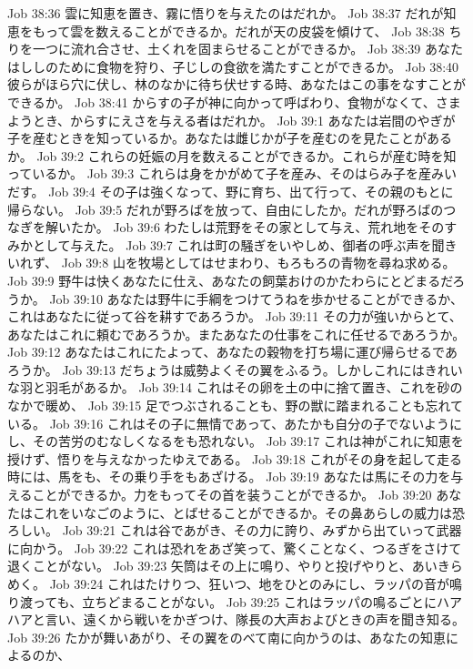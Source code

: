 Job 38:36  雲に知恵を置き、霧に悟りを与えたのはだれか。
Job 38:37  だれが知恵をもって雲を数えることができるか。だれが天の皮袋を傾けて、
Job 38:38  ちりを一つに流れ合させ、土くれを固まらせることができるか。
Job 38:39  あなたはししのために食物を狩り、子じしの食欲を満たすことができるか。
Job 38:40  彼らがほら穴に伏し、林のなかに待ち伏せする時、あなたはこの事をなすことができるか。
Job 38:41  からすの子が神に向かって呼ばわり、食物がなくて、さまようとき、からすにえさを与える者はだれか。
Job 39:1  あなたは岩間のやぎが子を産むときを知っているか。あなたは雌じかが子を産むのを見たことがあるか。
Job 39:2  これらの妊娠の月を数えることができるか。これらが産む時を知っているか。
Job 39:3  これらは身をかがめて子を産み、そのはらみ子を産みいだす。
Job 39:4  その子は強くなって、野に育ち、出て行って、その親のもとに帰らない。
Job 39:5  だれが野ろばを放って、自由にしたか。だれが野ろばのつなぎを解いたか。
Job 39:6  わたしは荒野をその家として与え、荒れ地をそのすみかとして与えた。
Job 39:7  これは町の騒ぎをいやしめ、御者の呼ぶ声を聞きいれず、
Job 39:8  山を牧場としてはせまわり、もろもろの青物を尋ね求める。
Job 39:9  野牛は快くあなたに仕え、あなたの飼葉おけのかたわらにとどまるだろうか。
Job 39:10  あなたは野牛に手綱をつけてうねを歩かせることができるか、これはあなたに従って谷を耕すであろうか。
Job 39:11  その力が強いからとて、あなたはこれに頼むであろうか。またあなたの仕事をこれに任せるであろうか。
Job 39:12  あなたはこれにたよって、あなたの穀物を打ち場に運び帰らせるであろうか。
Job 39:13  だちょうは威勢よくその翼をふるう。しかしこれにはきれいな羽と羽毛があるか。
Job 39:14  これはその卵を土の中に捨て置き、これを砂のなかで暖め、
Job 39:15  足でつぶされることも、野の獣に踏まれることも忘れている。
Job 39:16  これはその子に無情であって、あたかも自分の子でないようにし、その苦労のむなしくなるをも恐れない。
Job 39:17  これは神がこれに知恵を授けず、悟りを与えなかったゆえである。
Job 39:18  これがその身を起して走る時には、馬をも、その乗り手をもあざける。
Job 39:19  あなたは馬にその力を与えることができるか。力をもってその首を装うことができるか。
Job 39:20  あなたはこれをいなごのように、とばせることができるか。その鼻あらしの威力は恐ろしい。
Job 39:21  これは谷であがき、その力に誇り、みずから出ていって武器に向かう。
Job 39:22  これは恐れをあざ笑って、驚くことなく、つるぎをさけて退くことがない。
Job 39:23  矢筒はその上に鳴り、やりと投げやりと、あいきらめく。
Job 39:24  これはたけりつ、狂いつ、地をひとのみにし、ラッパの音が鳴り渡っても、立ちどまることがない。
Job 39:25  これはラッパの鳴るごとにハアハアと言い、遠くから戦いをかぎつけ、隊長の大声およびときの声を聞き知る。
Job 39:26  たかが舞いあがり、その翼をのべて南に向かうのは、あなたの知恵によるのか、
